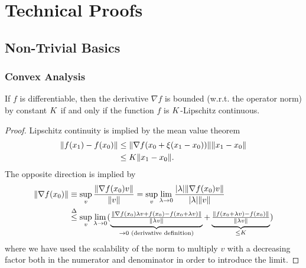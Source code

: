 
\chapter{Technical Proofs}

\section{Non-Trivial Basics}

\subsection{Convex Analysis}

\begin{lemma}\label{lem-appendix: lipschitz and bounded derivative}
	If \(f\) is differentiable, then the derivative \(\nabla f\) is
	bounded (w.r.t. the operator norm) by constant \(K\) if and only if the function
	\(f\) is \(K\)-Lipschitz continuous.
\end{lemma}
\begin{proof}
	Lipschitz continuity is implied by the mean value theorem
	\begin{align*}
		\|f(x_1) - f(x_0)\|
		&\le \|\nabla f(x_0 + \xi(x_1-x_0))\| \|x_1- x_0\|\\
		&\le K \|x_1-x_0\|.
	\end{align*}
	The opposite direction is implied by
	\begin{align*}
		\|\nabla f(x_0)\|
		&\equiv \sup_{v} \frac{\|\nabla f(x_0)v\|}{\|v\|}
		= \sup_{v} \lim_{\lambda\to 0}\frac{|\lambda|\|\nabla f(x_0) v\|}{|\lambda|\|v\|}\\
		&\lxle{\Delta}\sup_{v} \lim_{\lambda\to 0}
		(
			\underbrace{
				\tfrac{\|\nabla f(x_0)\lambda v + f(x_0) - f(x_0 +\lambda v)\|}{\|\lambda v\|}
			}_{
				\to 0 \text{ (derivative definition)}
			}
			+ \underbrace{
				\tfrac{\|f(x_0 + \lambda v) - f(x_0) \|}{\|\lambda v\|}
			}_{
				\le \lipConst 
			}
		)
	\end{align*}
	where we have used the scalability of the norm to multiply \(v\) with a
	decreasing factor both in the numerator and denominator in order to introduce
	the limit.
\end{proof}

